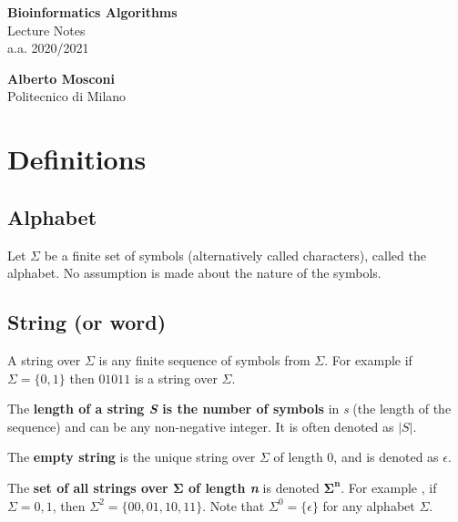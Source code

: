 \documentclass[12pt, letterpaper]{article}
\begin{document}
\begin{titlepage}
    
    \vspace*{2cm}
    
    \begin{center}
        \huge{\bfseries Bioinformatics Algorithms} \\[10pt]
        \Large{Lecture Notes} \\[10pt]
        \large{a.a. 2020/2021} \\
    \end{center}
    
    \vfill
    
    \begin{flushleft}        
        \large
        \textbf{Alberto Mosconi} \\
        \normalsize
        Politecnico di Milano
    \end{flushleft}
    
\end{titlepage}

\thispagestyle{empty}
\tableofcontents
\newpage

\setcounter{page}{1}

\section{Definitions}

\subsection{Alphabet}
Let $\Sigma$ be a finite set of symbols (alternatively called characters), called the alphabet. No assumption is made about the nature of the symbols.

\subsection{String (or word)}
A string over $\Sigma$ is any finite sequence of symbols from $\Sigma$. For example if $\Sigma = \{0,1\}$ then $01011$ is a string over $\Sigma$.

The \textbf{length of a string \emph{S} is the number of symbols} in \emph{s} (the length of the sequence) and can be any non-negative integer. It is often denoted as $|S|$.

The \textbf{empty string} is the unique string over $\Sigma$ of length 0, and is denoted as $\epsilon$.

The \textbf{set of all strings over $\mathbf{\Sigma}$ of length \emph{n}} is denoted $\mathbf{\Sigma^n}$. For example , if $\Sigma = {0, 1}$, then $\Sigma^2 = \{00, 01, 10, 11\}$. Note that $\Sigma^0 = \{\epsilon\}$ for any alphabet $\Sigma$.
\end{document}
